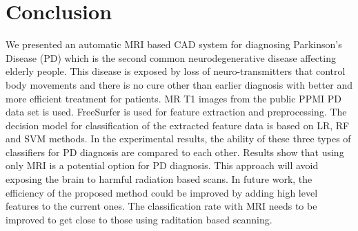 \documentclass[runningheads,a4paper]{llncs}
\begin{document}
\section{Conclusion}
We presented an automatic MRI based CAD system for diagnosing Parkinson’s Disease (PD) which is the second common neurodegenerative disease affecting elderly people. This disease is exposed by loss of neuro-transmitters that control body movements and there is no cure other than earlier diagnosis with better and more efficient treatment for patients. MR T1 images from the public PPMI PD data set is used. FreeSurfer is used for feature extraction and preprocessing. The decision model for classification of the extracted feature data is based on LR, RF and SVM methods. In the experimental results, the ability of these three types of classifiers for PD diagnosis are compared to each other. Results show that using only MRI is a potential option for PD diagnosis. This approach will avoid exposing the brain to harmful radiation based scans. In future work, the efficiency of the proposed method could be improved by adding high level features to the current ones. The classification rate with MRI needs to be improved to get close to those using raditation based scanning.
\end{document}
